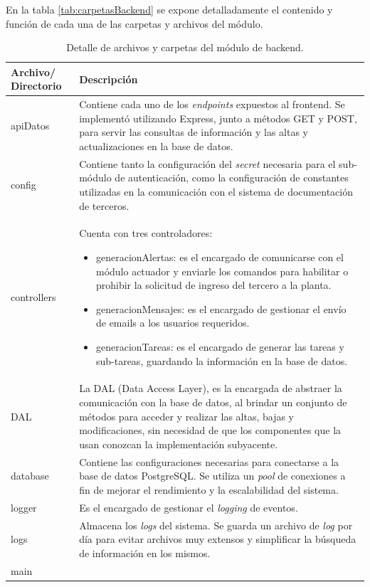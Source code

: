 En la tabla \ref{tab:carpetasBackend}  se expone detalladamente el contenido y función de cada una de las carpetas y archivos del módulo.

\begin{table}[h]
	\centering
	\caption[Detalle de archivos y carpetas del módulo de backend]{Detalle de archivos y carpetas del módulo de backend.}
	\begin{tabular}{p{2cm} p{11cm}} 	
		\toprule
		\textbf{Archivo/
		Directorio} & 
		\textbf{Descripción} 
		\\
		\midrule
apiDatos & Contiene cada uno de los \textit{endpoints} expuestos al frontend. Se implementó utilizando Express, junto a métodos GET y POST, para servir las consultas de información y las altas y actualizaciones en la base de datos. \\
config & Contiene tanto la configuración del \textit{secret} necesaria para el sub-módulo de autenticación, como la configuración de constantes utilizadas en la comunicación con el sistema de documentación de terceros. \\
controllers & Cuenta con tres controladores:
\begin{itemize}
\item generacionAlertas: es el encargado de comunicarse con el módulo actuador y enviarle los comandos para habilitar o prohibir la solicitud de ingreso del tercero a la planta.
\item generacionMensajes: es el encargado de gestionar el envío de emails a los usuarios requeridos.
\item generacionTareas: es el encargado de generar las tareas y sub-tareas, guardando la información en la base de datos.
\end{itemize} \\
DAL & La DAL (Data Access Layer), es la encargada de abstraer la comunicación con la base de datos, al brindar un conjunto de métodos para acceder y realizar las altas, bajas y modificaciones, sin necesidad de que los componentes que la usan conozcan la implementación subyacente. \\
database & Contiene las configuraciones necesarias para conectarse a la base de datos PostgreSQL. Se utiliza un \textit{pool} de conexiones a fin de mejorar el rendimiento y la escalabilidad del sistema. \\
logger & Es el encargado de gestionar el \textit{logging} de eventos.\\
logs & Almacena los \textit{logs} del sistema. Se guarda un archivo de \textit{log} por día para evitar archivos muy extensos y simplificar la búsqueda de información en los mismos. \\
main


\end{tabular}
\end{table}
